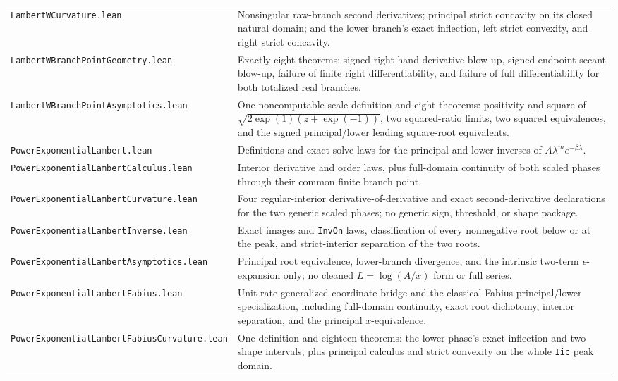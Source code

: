\documentclass[11pt,oneside]{article}
\theoremstyle{definition}
\theoremstyle{remark}
\begin{document}
\begin{longtable}{>{\raggedright\arraybackslash}p{} >{\raggedright\arraybackslash}p{}}
\nolinkurl{LambertWCurvature.lean} & Nonsingular raw-branch second derivatives; principal strict concavity on its closed natural domain; and the lower branch's exact inflection, left strict convexity, and right strict concavity. \\
\nolinkurl{LambertWBranchPointGeometry.lean} & Exactly eight theorems: signed right-hand derivative blow-up, signed endpoint-secant blow-up, failure of finite right differentiability, and failure of full differentiability for both totalized real branches. \\
\nolinkurl{LambertWBranchPointAsymptotics.lean} & One noncomputable scale definition and eight theorems: positivity and square of \(\sqrt{2\exp(1)(z+\exp(-1))}\), two squared-ratio limits, two squared equivalences, and the signed principal/lower leading square-root equivalents. \\
\nolinkurl{PowerExponentialLambert.lean} & Definitions and exact solve laws for the principal and lower inverses of \(A\lambda^m e^{-\beta\lambda}\). \\
\nolinkurl{PowerExponentialLambertCalculus.lean} & Interior derivative and order laws, plus full-domain continuity of both scaled phases through their common finite branch point. \\
\nolinkurl{PowerExponentialLambertCurvature.lean} & Four regular-interior derivative-of-derivative and exact second-derivative declarations for the two generic scaled phases; no generic sign, threshold, or shape package. \\
\nolinkurl{PowerExponentialLambertInverse.lean} & Exact images and \nolinkurl{InvOn} laws, classification of every nonnegative root below or at the peak, and strict-interior separation of the two roots. \\
\nolinkurl{PowerExponentialLambertAsymptotics.lean} & Principal root equivalence, lower-branch divergence, and the intrinsic two-term \(\epsilon\)-expansion only; no cleaned \(L=\log(A/x)\) form or full series. \\
\nolinkurl{PowerExponentialLambertFabius.lean} & Unit-rate generalized-coordinate bridge and the classical Fabius principal/lower specialization, including full-domain continuity, exact root dichotomy, interior separation, and the principal \(x\)-equivalence. \\
\nolinkurl{PowerExponentialLambertFabiusCurvature.lean} & One definition and eighteen theorems: the lower phase's exact inflection and two shape intervals, plus principal calculus and strict convexity on the whole \nolinkurl{Iic} peak domain. \\

\end{longtable}
\end{document}
